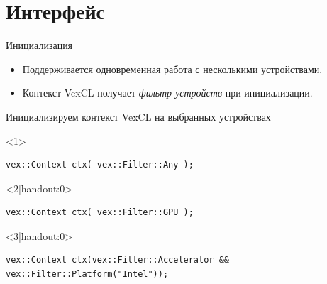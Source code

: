\documentclass[@BEAMER_OPTIONS@]{beamer}
\begin{document}
\section{Интерфейс}

\begin{frame}
    \sectionpage
\end{frame}

\begin{frame}[fragile]{Инициализация}
    \begin{itemize}
        \item Поддерживается одновременная работа с несколькими устройствами.
        \item Контекст VexCL получает \emph{фильтр устройств} при
            инициализации.
    \end{itemize}
    \begin{overlayarea}{\textwidth}{0.4\textheight}
    \begin{exampleblock}{Инициализируем контекст VexCL на выбранных устройствах}
        \begin{onlyenv}<1>
        \begin{lstlisting}
vex::Context ctx( vex::Filter::Any );
        \end{lstlisting}
        \end{onlyenv}
        \begin{onlyenv}<2|handout:0>
        \begin{lstlisting}
vex::Context ctx( vex::Filter::GPU );
        \end{lstlisting}
        \end{onlyenv}
        \begin{onlyenv}<3|handout:0>
        \begin{lstlisting}
vex::Context ctx(vex::Filter::Accelerator && vex::Filter::Platform("Intel"));
        \end{lstlisting}
        \end{onlyenv}
    \end{exampleblock}
    \end{overlayarea}
    \begin{figure}
\end{figure}
\end{frame}
\end{document}
